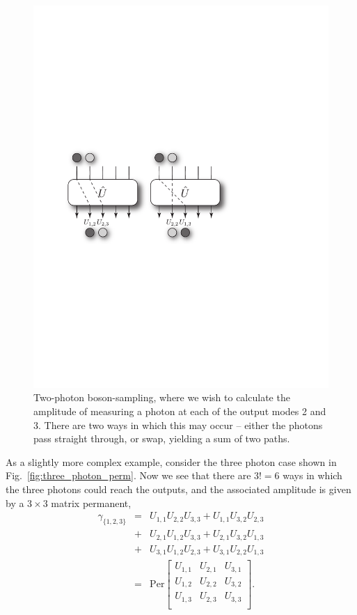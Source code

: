 \documentclass[aps,pra,twocolumn,amsmath,amssymb,nofootinbib,superscriptaddress]{revtex4}
\begin{document}
\begin{figure}[!htb]
\includegraphics[width=0.7\columnwidth]{two_photon_combinatorics}
\caption{Two-photon boson-sampling, where we wish to calculate the amplitude of measuring a photon at each of the output modes 2 and 3. There are two ways in which this may occur -- either the photons pass straight through, or swap, yielding a sum of two paths.} \label{fig:two_photon_perm}
\end{figure}

As a slightly more complex example, consider the three photon case shown in Fig.~\ref{fig:three_photon_perm}. Now we see that there are \mbox{$3!=6$} ways in which the three photons could reach the outputs, and the associated amplitude is given by a \mbox{$3\times 3$} matrix permanent,
\begin{eqnarray} \label{eq:coinProbEx3}
\gamma_{\{1,2,3\}} &=& U_{1,1}U_{2,2}U_{3,3} + U_{1,1}U_{3,2}U_{2,3} \nonumber \\
&+& U_{2,1}U_{1,2}U_{3,3} + U_{2,1}U_{3,2}U_{1,3} \nonumber \\
&+& U_{3,1}U_{1,2}U_{2,3} + U_{3,1}U_{2,2}U_{1,3}
\nonumber \\
&=& \mathrm{Per} \left[ {\begin{array}{ccc}
   U_{1,1} & U_{2,1} & U_{3,1} \\
   U_{1,2} & U_{2,2} & U_{3,2} \\
   U_{1,3} & U_{2,3} & U_{3,3} \\
  \end{array} } \right].
\end{eqnarray}
\end{document}
